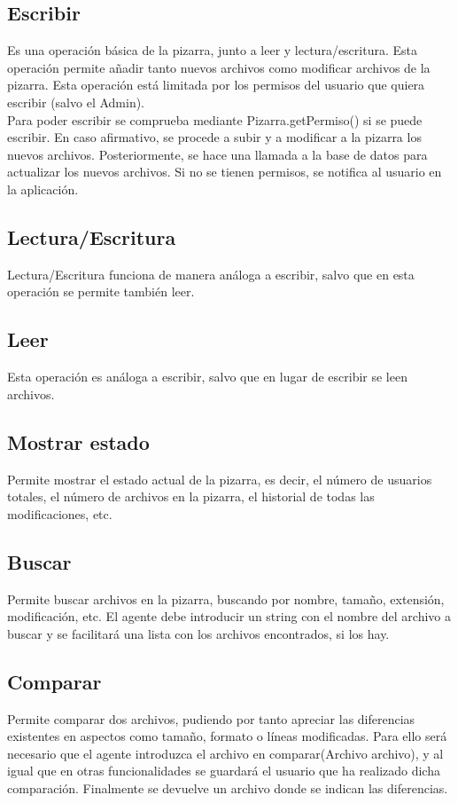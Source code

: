 \subsection{Escribir}
Es una operación básica de la pizarra, junto a leer y lectura/escritura. Esta operación permite añadir tanto nuevos archivos como modificar archivos de la pizarra. Esta operación está limitada por los permisos del usuario que quiera escribir (salvo el Admin).\\
Para poder escribir se comprueba mediante Pizarra.getPermiso() si se puede escribir. En caso afirmativo, se procede a subir y a modificar a la pizarra los nuevos archivos. Posteriormente, se hace una llamada a la base de datos para actualizar los nuevos archivos. Si no se tienen permisos, se notifica al usuario en la aplicación.

\subsection{Lectura/Escritura}
Lectura/Escritura funciona de manera análoga a escribir, salvo que en esta operación se permite también leer.

\subsection{Leer}
Esta operación es análoga a escribir, salvo que en lugar de escribir se leen archivos.

\subsection{Mostrar estado}
Permite mostrar el estado actual de la pizarra, es decir, el número de usuarios totales, el número de archivos en la pizarra, el historial de todas las modificaciones, etc.

\subsection{Buscar}
Permite buscar archivos en la pizarra, buscando por nombre, tamaño, extensión, modificación, etc. El agente debe introducir un string con el nombre del archivo a buscar y se facilitará una lista con los archivos encontrados, si los hay.

\subsection{Comparar}
Permite comparar dos archivos, pudiendo por tanto apreciar las diferencias existentes en aspectos como tamaño, formato o líneas modificadas. Para ello será necesario que el agente introduzca el archivo en comparar(Archivo archivo), y al igual que en otras funcionalidades se guardará el usuario que ha realizado dicha comparación. Finalmente se devuelve un archivo donde se indican las diferencias.

